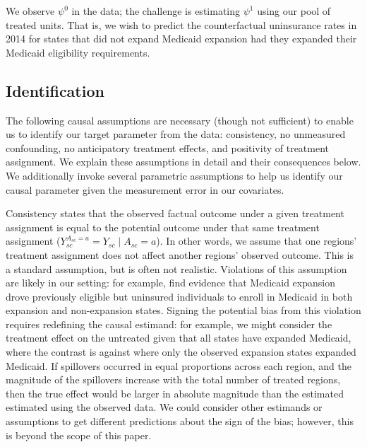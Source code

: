 \documentclass[12pt]{article}
\begin{document}
We observe $\psi^0$ in the data; the challenge is estimating $\psi^1$ using our pool of treated units. That is, we wish to predict the counterfactual uninsurance rates in 2014 for states that did not expand Medicaid expansion had they expanded their Medicaid eligibility requirements.  

\subsection{Identification}

The following causal assumptions are necessary (though not sufficient) to enable us to identify our target parameter from the data: consistency, no unmeasured confounding, no anticipatory treatment effects, and positivity of treatment assignment. We explain these assumptions in detail and their consequences below. We additionally invoke several parametric assumptions to help us identify our causal parameter given the measurement error in our covariates.

Consistency states that the observed factual outcome under a given treatment assignment is equal to the potential outcome under that same treatment assignment ($Y_{sc}^{A_{sc} = a} = Y_{sc} \mid A_{sc} = a$). In other words, we assume that one regions' treatment assignment does not affect another regions' observed outcome. This is a standard assumption, but is often not realistic. Violations of this assumption are likely in our setting: for example, \cite{frean2017premium} find evidence that Medicaid expansion drove previously eligible but uninsured individuals to enroll in Medicaid in both expansion and non-expansion states. Signing the potential bias from this violation requires redefining the causal estimand: for example, we might consider the treatment effect on the untreated given that all states have expanded Medicaid, where the contrast is against where only the observed expansion states expanded Medicaid. If spillovers occurred in equal proportions across each region, and the magnitude of the spillovers increase with the total number of treated regions, then the true effect would be larger in absolute magnitude than the estimated estimated using the observed data. We could consider other estimands or assumptions to get different predictions about the sign of the bias; however, this is beyond the scope of this paper.
\end{document}
